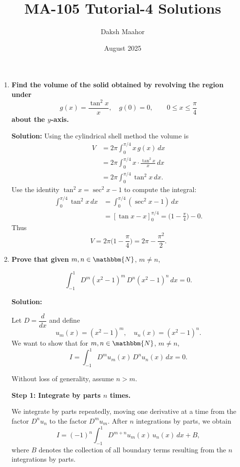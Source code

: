 \documentclass[14pt]{extarticle}
\title{\vspace{-3cm}MA-105 Tutorial-4 Solutions}
\author{Daksh Maahor}
\date{August 2025}
\begin{document}
\maketitle

\bigskip

\begin{enumerate}

\item \textbf{Find the volume of the solid obtained by revolving the region under}
\[g(x)=\frac{\tan^2 x}{x},\quad g(0)=0,\qquad 0\le x\le \frac{\pi}{4}\]
\textbf{about the $y$-axis.}

\textbf{Solution:}
Using the cylindrical shell method the volume is
\begin{align*}    
V&=2\pi\int_{0}^{\pi/4} x\,g(x)\,dx \\ &= 2\pi\int_0^{\pi/4} x\cdot\frac{\tan^2 x}{x}\,dx \\&= 2\pi\int_0^{\pi/4}\tan^2 x\,dx.
\end{align*}
Use the identity $\tan^2 x=\sec^2 x-1$ to compute the integral:
\begin{align*}
\int_0^{\pi/4} \tan^2 x\,dx &= \int_0^{\pi/4}(\sec^2 x-1)\,dx \\&= [\tan x - x]_0^{\pi/4} = \big(1-\tfrac{\pi}{4}\big)-0.
\end{align*}
Thus
\[
V = 2\pi\Big(1-\frac{\pi}{4}\Big) = 2\pi - \frac{\pi^2}{2}.
\]

\bigskip
\item \textbf{Prove that given } $m,n \in\mathbbm{N}$, $m\ne n$,

\[
\int_{-1}^1 D^m(x^2-1)^m\, D^n(x^2-1)^n\,dx = 0.
\]

\textbf{Solution:}

Let $D = \dfrac{d}{dx}$ and define
\[
  u_m(x) = (x^2 - 1)^m, \quad u_n(x) = (x^2 - 1)^n.
\]
We want to show that for $m,n \in \mathbbm{N}$, $m \neq n$,
\[
I = \int_{-1}^{1} D^m u_m(x) \, D^n u_n(x) \, dx = 0.
\]

Without loss of generality, assume $n > m$.

\bigskip
\textbf{Step 1: Integrate by parts $n$ times.}

We integrate by parts repeatedly, moving one derivative at a time from the factor $D^n u_n$ to the factor $D^m u_m$. After $n$ integrations by parts, we obtain
\[
I = (-1)^n \int_{-1}^1 D^{m+n} u_m(x) \, u_n(x) \, dx + B, \tag{1}
\]
where $B$ denotes the collection of all boundary terms resulting from the $n$ integrations by parts.


\end{enumerate}
\end{document}
